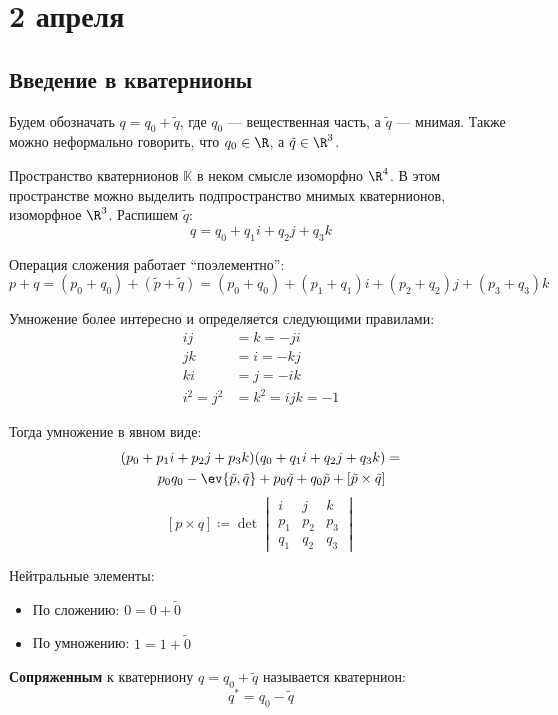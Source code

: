 \chapter{2 апреля}

\section{Введение в кватернионы}

Будем обозначать $q = q_0 + \tilde{q}$, где $q_0$ --- вещественная часть, а $\tilde{q}$ --- мнимая.
Также можно неформально говорить, что $q_0 \in \R$, а $\tilde{q} \in \R^3$.

Пространство кватернионов $\mathbb{K}$ в неком смысле изоморфно $\R^4$.
В этом пространстве можно выделить подпространство мнимых кватернионов, изоморфное $\R^3$.
Распишем $\tilde{q}$:
\[q = q_0 + q_1 i + q_2 j + q_3 k\]

Операция сложения работает ``поэлементно'':
\[p + q = (p_0 + q_0) + (\tilde{p} + \tilde{q}) = (p_0 + q_0) + (p_1 + q_1)i + (p_2 + q_2)j + (p_3 + q_3)k\]

Умножение более интересно и определяется следующими правилами:
\begin{align*}
	ij        & = k = -ji        \\
	jk        & = i = -kj        \\
	ki        & = j = -ik        \\
	i^2 = j^2 & = k^2 = ijk = -1
\end{align*}

Тогда умножение в явном виде:
\begin{align*}
	(p_0 + p_1 i + p_2 j + p_3 k) (q_0 + q_1 i + q_2 j + q_3 k) & = \\
	p_0 q_0 - \ev{\tilde{p}, \tilde{q}} + p_0 \tilde{q} + q_0 \tilde{p} + [\tilde{p} \times \tilde{q}]
\end{align*}
\[
	[p \times q] \coloneqq \det \begin{vmatrix} i & j & k \\ p_1 & p_2 & p_3 \\ q_1 & q_2 & q_3 \end{vmatrix}
\]

Нейтральные элементы:
\begin{itemize}
	\item По сложению: $0 = 0 + \tilde{0}$
	\item По умножению: $1 = 1 + \tilde{0}$
\end{itemize}

\begin{definition}
	\textbf{Сопряженным} к кватерниону $q = q_0 + \tilde{q}$ называется кватернион:
	\[q^* = q_0 - \tilde{q}\]
\end{definition}

